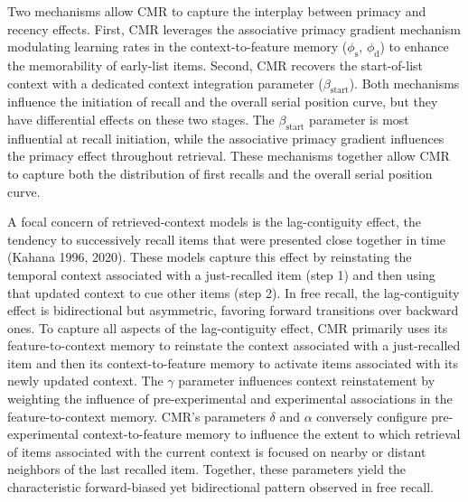 \documentclass[
  letterpaper,
  11pt,
  english,
  singlespacing,
  headsepline]{MastersDoctoralThesis}
\begin{document}
Two mechanisms allow CMR to capture the interplay between primacy and
recency effects. First, CMR leverages the associative primacy gradient
mechanism modulating learning rates in the context-to-feature memory
(\(\phi_\text{s}\), \(\phi_\text{d}\)) to enhance the memorability of
early-list items. Second, CMR recovers the start-of-list context with a
dedicated context integration parameter (\(\beta_\text{start}\)). Both
mechanisms influence the initiation of recall and the overall serial
position curve, but they have differential effects on these two stages.
The \(\beta_\text{start}\) parameter is most influential at recall
initiation, while the associative primacy gradient influences the
primacy effect throughout retrieval. These mechanisms together allow CMR
to capture both the distribution of first recalls and the overall serial
position curve.

A focal concern of retrieved-context models is the lag-contiguity
effect, the tendency to successively recall items that were presented
close together in time (Kahana 1996, 2020). These models capture this
effect by reinstating the temporal context associated with a
just-recalled item (step 1) and then using that updated context to cue
other items (step 2). In free recall, the lag-contiguity effect is
bidirectional but asymmetric, favoring forward transitions over backward
ones. To capture all aspects of the lag-contiguity effect, CMR primarily
uses its feature-to-context memory to reinstate the context associated
with a just-recalled item and then its context-to-feature memory to
activate items associated with its newly updated context. The \(\gamma\)
parameter influences context reinstatement by weighting the influence of
pre-experimental and experimental associations in the feature-to-context
memory. CMR's parameters \(\delta\) and \(\alpha\) conversely configure
pre-experimental context-to-feature memory to influence the extent to
which retrieval of items associated with the current context is focused
on nearby or distant neighbors of the last recalled item. Together,
these parameters yield the characteristic forward-biased yet
bidirectional pattern observed in free recall.
\end{document}
